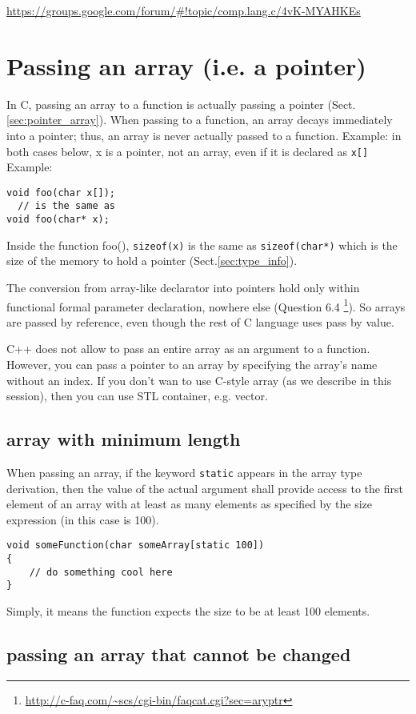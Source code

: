 \url{https://groups.google.com/forum/#!topic/comp.lang.c/4vK-MYAHKEs}

\section{Passing an array (i.e. a pointer)}
\label{sec:function_pass-array}

In C, passing an array to a function is actually passing a pointer
(Sect.\ref{sec:pointer_array}). When passing to a function, an array decays
immediately into a pointer; thus, an array is never actually passed to a
function. Example:
in both cases below, x is a pointer, not an array, even if it is declared as
\verb!x[]!
Example:
\begin{verbatim}
void foo(char x[]);
  // is the same as
void foo(char* x);
\end{verbatim}
Inside the function foo(), \verb!sizeof(x)! is the same as \verb!sizeof(char*)!
which is the size of the memory to hold a pointer (Sect.\ref{sec:type_info}).

The conversion from array-like declarator into pointers hold only within
functional formal parameter declaration, nowhere else (Question 6.4
\footnote{\url{http://c-faq.com/~scs/cgi-bin/faqcat.cgi?sec=aryptr}}). So arrays
are passed by reference, even though the rest of C language uses pass by value.

C++ does not allow to pass an entire array as an argument to a function.
However, you can pass a pointer to an array by specifying the array's name
without an index. If you don't wan to use C-style array (as we describe in this
session), then you can use STL container, e.g. vector. 

\subsection{array with minimum length}

When passing an array, if the keyword \verb!static! appears in the array type
derivation, then the value of the actual argument shall provide access to the
first element of an array with at least as many elements as specified by the
size expression (in this case is 100).
\begin{verbatim}
void someFunction(char someArray[static 100])
{
    // do something cool here
}
\end{verbatim}
Simply, it means the function expects the size to be at least 100 elements.

\subsection{passing an array that cannot be changed}

